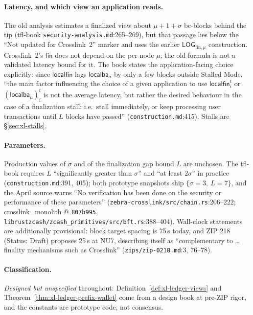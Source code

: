 \documentclass[11pt,a4paper]{article}
\theoremstyle{definition}
\begin{document}
\paragraph{Latency, and which view an application reads.} The old
analysis estimates a finalized view about $\mu + 1 + \sigma$ bc-blocks
behind the tip (tfl-book \texttt{security-analysis.md}:265--269), but
that passage lies below the ``Not updated for Crosslink~2'' marker and
uses the earlier $\mathsf{LOG}_{\mathrm{fin},\mu}$ construction.
Crosslink~2's $\mathsf{fin}$ does not depend on the per-node $\mu$;
the old formula is not a validated latency bound for it. The book
states the application-facing
choice explicitly: since $\mathsf{localfin}$ lags
$\mathsf{localba}_{\sigma}$ by only a few blocks outside Stalled Mode,
``the main factor influencing the choice of a given application to use
$\mathsf{localfin}_i^t$ or $(\mathsf{localba}_{\mu})_i^t$ is not the
average latency, but rather the desired behaviour in the case of a
finalization stall: i.e.\ stall immediately, or keep processing user
transactions until $L$ blocks have passed''
(\texttt{construction.md}:415). Stalls are \S\ref{sec:xl-stalls}.

\paragraph{Parameters.} Production values of $\sigma$ and of the
finalization gap bound $L$ are unchosen. The tfl-book requires $L$
``significantly greater than $\sigma$'' and ``at least $2\sigma$'' in
practice (\texttt{construction.md}:391, 405); both prototype snapshots
ship $\{\sigma = 3,\ L = 7\}$, and the April source warns ``No
verification has been done on the security or performance of these
parameters'' (\texttt{zebra-crosslink/src/chain.rs}:206--222;
crosslink\_monolith @ \texttt{807b995},
\texttt{librustzcash/zcash\_primitives/src/bft.rs}:388--404). Wall-clock statements
are additionally provisional: block target spacing is 75\,s today, and ZIP
218 (Status: Draft) proposes 25\,s at NU7, describing itself as
``complementary to \ldots{} finality mechanisms such as Crosslink''
(\texttt{zips/zip-0218.md}:3, 76--78).

\paragraph{Classification.} \emph{Designed but unspecified} throughout:
Definition~\ref{def:xl-ledger-views} and
Theorem~\ref{thm:xl-ledger-prefix-wallet} come from a design book at pre-ZIP
rigor, and the constants are prototype code, not consensus.
\end{document}
